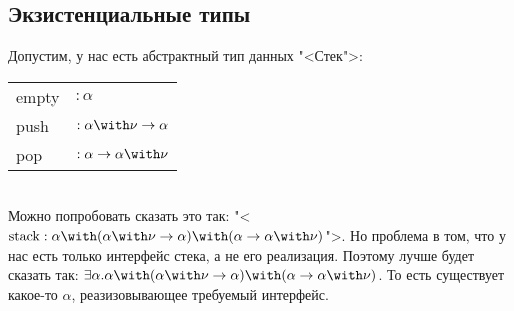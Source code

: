 \subsection{\texorpdfstring{Экзистенциальные типы}{Existential types}}

Допустим, у нас есть абстрактный тип данных "<Стек">: \\
\begin{tabular}{l l}
    empty & $: \alpha$ \\
    push  & $: \alpha\with\nu\rightarrow\alpha$ \\
    pop   & $: \alpha\rightarrow\alpha\with\nu$ \\
\end{tabular} \\
Можно попробовать сказать это так: "<$\mathrm{stack} :
    \alpha \with (\alpha\with\nu\rightarrow\alpha) \with (\alpha\rightarrow\alpha\with\nu)$">.
Но проблема в том, что у нас есть только интерфейс стека, а не его реализация. Поэтому лучше будет сказать так:
    $\exists \alpha . \alpha \with (\alpha\with\nu\rightarrow\alpha) \with (\alpha\rightarrow\alpha\with\nu)$.
То есть существует какое-то $\alpha$, реазизовывающее требуемый интерфейс.

